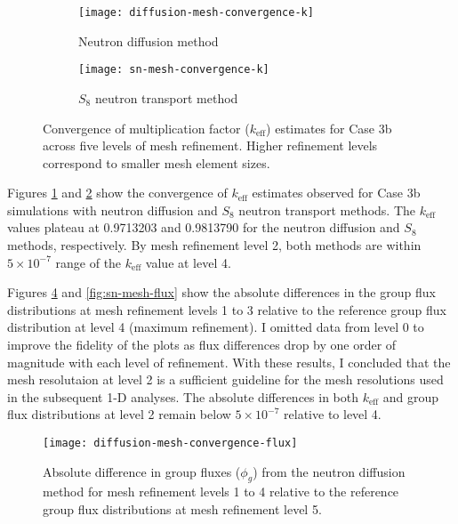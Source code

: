 \begin{figure}[htb!]
  \centering
  \begin{subfigure}[b]{0.48\columnwidth}
    \centering
    \texttt{[image: diffusion-mesh-convergence-k]}
    \caption{Neutron diffusion method}
    \label{fig:diff-mesh-k}
  \end{subfigure}
  \hfill
  \begin{subfigure}[b]{0.48\columnwidth}
    \centering
    \texttt{[image: sn-mesh-convergence-k]}
    \caption{$S_8$ neutron transport method}
    \label{fig:sn-mesh-k}
  \end{subfigure}
  \caption{Convergence of multiplication factor ($k_\text{eff}$) estimates for Case 3b across five
    levels of mesh refinement. Higher refinement levels correspond to smaller mesh element sizes.}
  \label{fig:mesh-k}
\end{figure}

Figures \ref{fig:diff-mesh-k} and \ref{fig:sn-mesh-k} show the convergence of $k_\text{eff}$
estimates observed for Case 3b simulations with neutron diffusion and $S_8$ neutron transport
methods. The $k_\text{eff}$ values plateau at 0.9713203 and 0.9813790 for the neutron diffusion and
$S_8$ methods, respectively. By mesh refinement level 2, both methods are within $5\times 10^{-7}$
range of the $k_\text{eff}$ value at level 4.

Figures \ref{fig:diff-mesh-flux} and \ref{fig:sn-mesh-flux} show the absolute differences in the
group flux distributions at mesh refinement levels 1 to 3 relative to the reference group flux
distribution at level 4 (maximum refinement). I omitted data from level 0 to improve the fidelity
of the plots as flux differences drop by one order of magnitude with each level of refinement.
With these results, I concluded that the mesh resolutaion at level 2 is a sufficient guideline for
the mesh resolutions used in the subsequent 1-D analyses. The absolute differences in both
$k_\text{eff}$ and group flux distributions at level 2 remain below $5\times10^{-7}$ relative to
level 4.

\begin{figure}[htb!]
  \centering
  \texttt{[image: diffusion-mesh-convergence-flux]}
  \caption{Absolute difference in group fluxes ($\phi_g$) from the neutron diffusion method for
  mesh refinement levels 1 to 4 relative to the reference group flux distributions at mesh
  refinement level 5.}
  \label{fig:diff-mesh-flux}
\end{figure}


